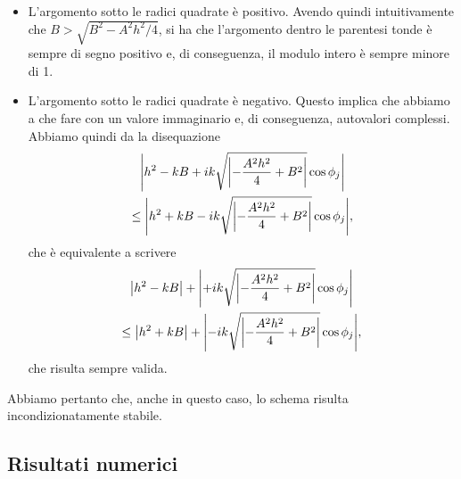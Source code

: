 \documentclass[10pt,a4paper]{article}
\begin{document}
\begin{itemize}
	\item L'argomento sotto le radici quadrate è positivo. Avendo quindi intuitivamente che $B > \sqrt{B^2 - A^2h^2/4}$, si ha che l'argomento dentro le parentesi tonde è sempre di segno positivo e, di conseguenza, il modulo intero è sempre minore di 1.
	\item L'argomento sotto le radici quadrate è negativo. Questo implica che abbiamo a che fare con un valore immaginario e, di conseguenza, autovalori complessi. Abbiamo quindi da la disequazione
	\begin{multline}
		\abs{h^2 - kB + ik\sqrt{\abs{-\frac{A^2 h^2}{4}+B^2}} \cos{\phi_j}} \\\leq \abs{h^2 + kB - ik\sqrt{\abs{-\frac{A^2 h^2}{4}+B^2}} \cos{\phi_j}},
	\end{multline}
	che è equivalente a scrivere
	\begin{multline}
		\abs{h^2 - kB }+\abs{+ ik\sqrt{\abs{-\frac{A^2 h^2}{4}+B^2}} \cos{\phi_j}} \\\leq \abs{h^2 + kB }+\abs{- ik\sqrt{\abs{-\frac{A^2 h^2}{4}+B^2}} \cos{\phi_j}},
	\end{multline}
	che risulta sempre valida.
\end{itemize}
Abbiamo pertanto che, anche in questo caso, lo schema risulta incondizionatamente stabile.

\subsection{Risultati numerici}
\end{document}
